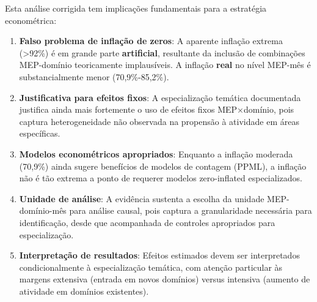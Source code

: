 


Esta análise corrigida tem implicações fundamentais para a estratégia econométrica:

\begin{enumerate}
    \item \textbf{Falso problema de inflação de zeros}: A aparente inflação extrema (>92\%) é em grande parte \textbf{artificial}, resultante da inclusão de combinações MEP-domínio teoricamente implausíveis. A inflação \textbf{real} no nível MEP-mês é substancialmente menor (70,9\%-85,2\%).
    
    \item \textbf{Justificativa para efeitos fixos}: A especialização temática documentada justifica ainda mais fortemente o uso de efeitos fixos MEP×domínio, pois captura heterogeneidade não observada na propensão à atividade em áreas específicas.
    
    \item \textbf{Modelos econométricos apropriados}: Enquanto a inflação moderada (70,9\%) ainda sugere benefícios de modelos de contagem (PPML), a inflação não é tão extrema a ponto de requerer modelos zero-inflated especializados.
    
    \item \textbf{Unidade de análise}: A evidência sustenta a escolha da unidade MEP-domínio-mês para análise causal, pois captura a granularidade necessária para identificação, desde que acompanhada de controles apropriados para especialização.
    
    \item \textbf{Interpretação de resultados}: Efeitos estimados devem ser interpretados condicionalmente à especialização temática, com atenção particular às margens extensiva (entrada em novos domínios) versus intensiva (aumento de atividade em domínios existentes).
\end{enumerate}

